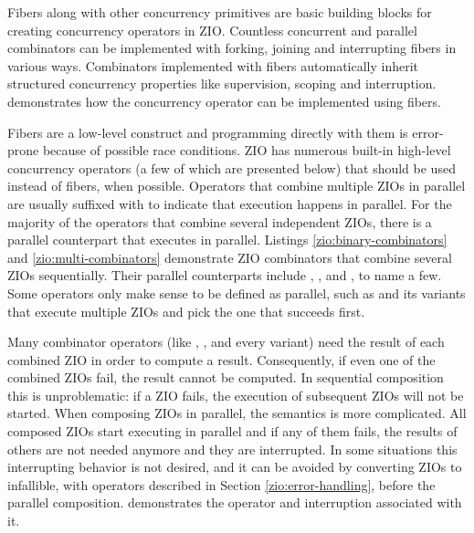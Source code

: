 Fibers along with other concurrency primitives are basic building blocks for creating concurrency operators in ZIO. Countless concurrent and parallel combinators can be implemented with forking, joining and interrupting fibers in various ways. Combinators implemented with fibers automatically inherit structured concurrency properties like supervision, scoping and interruption.  demonstrates how the  concurrency operator can be implemented using fibers.



Fibers are a low-level construct and programming directly with them is error-prone because of possible race conditions. ZIO has numerous built-in high-level concurrency operators (a few of which are presented below) that should be used instead of fibers, when possible. Operators that combine multiple ZIOs in parallel are usually suffixed with  to indicate that execution happens in parallel. For the majority of the operators that combine several independent ZIOs, there is a parallel counterpart that executes in parallel. Listings \ref{zio:binary-combinators} and \ref{zio:multi-combinators} demonstrate ZIO combinators that combine several ZIOs sequentially. Their parallel counterparts include , , and , to name a few. Some operators only make sense to be defined as parallel, such as  and its variants that execute multiple ZIOs and pick the one that succeeds first.

Many combinator operators (like , , and every  variant) need the result of each combined ZIO in order to compute a result. Consequently, if even one of the combined ZIOs fail, the result cannot be computed. In sequential composition this is unproblematic: if a ZIO fails, the execution of subsequent ZIOs will not be started. When composing ZIOs in parallel, the semantics is more complicated. All composed ZIOs start executing in parallel and if any of them fails, the results of others are not needed anymore and they are interrupted. In some situations this interrupting behavior is not desired, and it can be avoided by converting ZIOs to infallible, with operators described in Section \ref{zio:error-handling}, before the parallel composition.  demonstrates the  operator and interruption associated with it.

